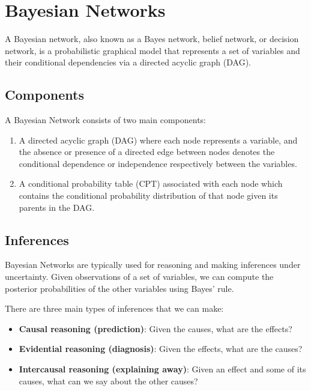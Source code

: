 \chapter{Bayesian Networks}

A Bayesian network, also known as a Bayes network, belief network, or
decision network, is a probabilistic graphical model that represents a
set of variables and their conditional dependencies via a directed
acyclic graph (DAG).

\section{Components}

A Bayesian Network consists of two main components:

\begin{enumerate}
    \item A directed acyclic graph (DAG) where each node represents a
      variable, and the absence or presence of a directed edge between
      nodes denotes the conditional dependence or independence
      respectively between the variables.
    \item A conditional probability table (CPT) associated with each
      node which contains the conditional probability distribution of
      that node given its parents in the DAG.
\end{enumerate}

\section{Inferences}

Bayesian Networks are typically used for reasoning and making
inferences under uncertainty. Given observations of a set of
variables, we can compute the posterior probabilities of the other
variables using Bayes' rule.

There are three main types of inferences that we can make:

\begin{itemize}
    \item \textbf{Causal reasoning (prediction)}: Given the causes,
      what are the effects?
    \item \textbf{Evidential reasoning (diagnosis)}: Given the
      effects, what are the causes?
    \item \textbf{Intercausal reasoning (explaining away)}: Given an
      effect and some of its causes, what can we say about the other
      causes?
\end{itemize}

